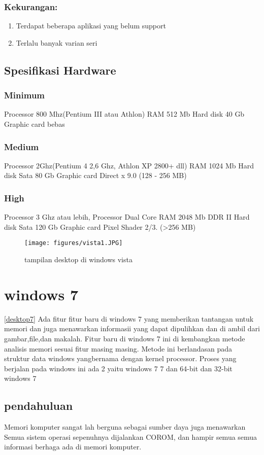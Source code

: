 \begin{enumerate}
		\subsubsection{Kekurangan:}
\begin{enumerate}
			\item Terdapat beberapa aplikasi yang belum support
			\item Terlalu banyak varian seri
\end{enumerate}
	\subsection{Spesifikasi Hardware}
		\subsubsection{Minimum}
			Processor 800 Mhz(Pentium III atau Athlon)
			RAM 512 Mb
			Hard disk 40 Gb
			Graphic card bebas
		\subsubsection{Medium}
			Processor 2Ghz(Pentium 4 2,6 Ghz, Athlon XP 2800+ dll)
			RAM 1024 Mb
			Hard disk Sata 80 Gb
			Graphic card Direct x 9.0 (128 - 256 MB)
		\subsubsection{High}
			Processor 3 Ghz atau lebih, Processor Dual Core
			RAM 2048 Mb DDR II
			Hard disk Sata 120 Gb
			Graphic card Pixel Shader 2/3. (>256 MB)


\begin{figure}[ht]
\centerline{\texttt{[image: figures/vista1.JPG]}}
\caption{tampilan desktop di windows vista}
\label{vista1}
\end{figure}


	\section{windows 7}
\ref{desktop7}
		Ada fitur fitur baru di windows 7 yang memberikan tantangan untuk memori
		dan juga menawarkan informasii yang dapat dipulihkan dan di ambil dari
		gambar,file,dan makalah. Fitur baru di windows 7 ini di kembangkan 
		metode analisis memori sesuai fitur masing masing. Metode ini
		berlandasan pada struktur data windows yangbernama dengan kernel
		processor. Proses yang berjalan pada windows ini ada 2 yaitu windows 7 
		7 dan 64-bit dan 32-bit windows 7
		\subsection{pendahuluan}
			Memori komputer sangat lah berguna sebagai sumber daya juga menawarkan
			Semua sistem operasi sepenuhnya dijalankan COROM, dan hampir semua
			semua informasi berhaga ada di memori komputer.

\end{enumerate}

